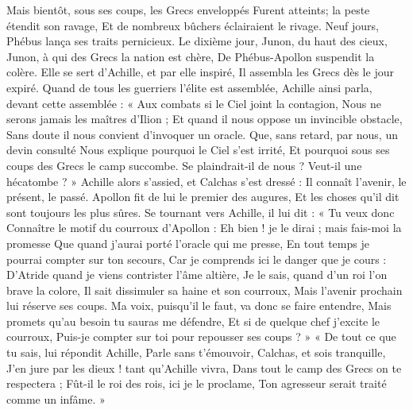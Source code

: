 \documentclass{article}
\begin{document}
{{Mais bientôt, sous ses coups, les Grecs enveloppés
Furent atteints; la peste étendit son ravage,
Et de nombreux bûchers éclairaient le rivage.
Neuf jours, Phébus lança ses traits pernicieux.
Le dixième jour, Junon, du haut des cieux,
Junon, à qui des Grecs la nation est chère,
De Phébus-Apollon suspendit la colère.
Elle se sert d'Achille, et par elle inspiré,
Il assembla les Grecs dès le jour expiré.
Quand de tous les guerriers l'élite est assemblée,
Achille ainsi parla, devant cette assemblée :
« Aux combats si le Ciel joint la contagion,
Nous ne serons jamais les maîtres d'Ilion ;
Et quand il nous oppose un invincible obstacle,
Sans doute il nous convient d'invoquer un oracle.
Que, sans retard, par nous, un devin consulté
Nous explique pourquoi le Ciel s'est irrité,
Et pourquoi sous ses coups des Grecs le camp succombe.
Se plaindrait-il de nous ? Veut-il une hécatombe ? »
Achille alors s'assied, et Calchas s'est dressé :
Il connaît l'avenir, le présent, le passé.
Apollon fit de lui le premier des augures,
Et les choses qu'il dit sont toujours les plus sûres.
Se tournant vers Achille, il lui dit : « Tu veux donc
Connaître le motif du courroux d'Apollon :
Eh bien ! je le dirai ; mais fais-moi la promesse
Que quand j'aurai porté l'oracle qui me presse,
En tout temps je pourrai compter sur ton secours,
Car je comprends ici le danger que je cours :
D'Atride quand je viens contrister l’âme altière,
Je le sais, quand d'un roi l'on brave la colore,
Il sait dissimuler sa haine et son courroux,
Mais l'avenir prochain  lui réserve ses coups.
Ma voix, puisqu'il le faut, va donc se faire entendre,
Mais promets qu'au besoin tu sauras me défendre,
Et si de quelque chef j'excite le courroux,
Puis-je compter sur toi pour repousser ses coups ? »
« De tout ce que tu sais, lui répondit Achille,
Parle sans t'émouvoir, Calchas, et sois tranquille,
J'en jure par les dieux ! tant qu'Achille vivra,
Dans tout le camp des Grecs on te respectera ;
Fût-il le roi des rois, ici je le proclame,
Ton agresseur serait traité comme un infâme. »}}
\end{document}
